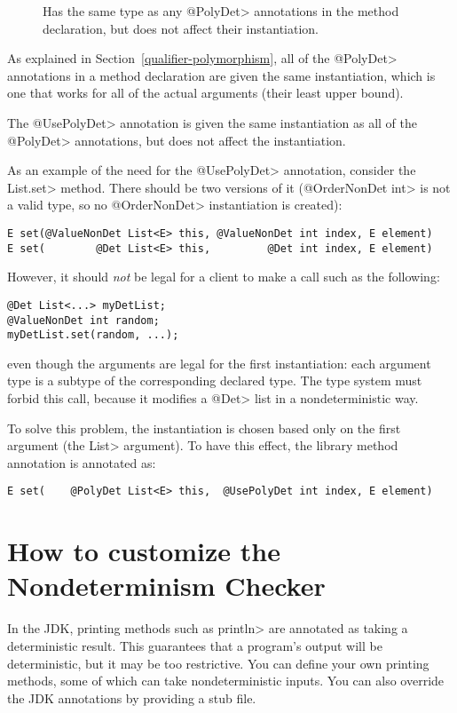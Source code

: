 \begin{description}
\item[]
  Has the same type as any \<@PolyDet> annotations in the method
  declaration, but does not affect their instantiation.
\end{description}

As explained in Section~\ref{qualifier-polymorphism},
all of the \<@PolyDet> annotations in a method declaration are given the same
instantiation, which is one that works for all of the actual arguments
(their least upper bound).

The \<@UsePolyDet> annotation is given the same instantiation as all of the
\<@PolyDet> annotations, but does not affect the instantiation.

As an example of the need for the \<@UsePolyDet> annotation, consider the
\<List.set> method.  There should be two versions of it (\<@OrderNonDet
int> is not a valid type, so no \<@OrderNonDet> instantiation is created):

\begin{Verbatim}
E set(@ValueNonDet List<E> this, @ValueNonDet int index, E element)
E set(        @Det List<E> this,         @Det int index, E element)
\end{Verbatim}

\noindent
However, it should \emph{not} be legal for a client to make a call such as
the following:

\begin{Verbatim}
@Det List<...> myDetList;
@ValueNonDet int random;
myDetList.set(random, ...);
\end{Verbatim}

\noindent
even though the arguments are legal for the first instantiation:
each argument type is a subtype of the corresponding declared type.
The type system must forbid this call, because it modifies a
\<@Det> list in a nondeterministic way.

To solve this problem, the instantiation is chosen based only on the first
argument (the \<List> argument).  To have this effect, the library method
annotation is annotated as:

\begin{Verbatim}
E set(    @PolyDet List<E> this,  @UsePolyDet int index, E element)
\end{Verbatim}



\section{How to customize the Nondeterminism Checker\label{nondeterminism-customization}}

In the JDK, printing methods such as \<println> are annotated as taking a
deterministic result.  This guarantees that a program's output will be
deterministic, but it may be too restrictive.  You can define your own
printing methods, some of which can take nondeterministic inputs.  You can
also override the JDK annotations by providing a stub file.


